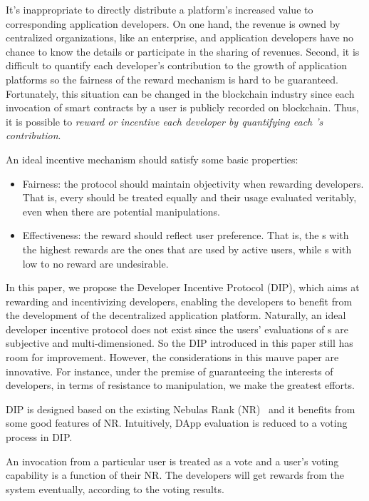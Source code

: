 It's inappropriate to directly distribute a platform's increased value to
corresponding application developers. On one hand, the revenue is owned by
centralized organizations, like an enterprise, and application developers have
no chance to know the details or participate in the sharing of revenues. Second, it
is difficult to quantify each developer's contribution to the growth of
application platforms so the fairness of the reward mechanism is hard to be guaranteed. Fortunately, this situation can be changed in the blockchain
industry since each invocation of smart contracts by a user is
publicly recorded on blockchain. Thus, it is possible to \emph{reward or incentive each \dapp developer by
quantifying each \dapp's contribution}.

An ideal incentive mechanism should satisfy some basic properties:
\begin{itemize}

\item Fairness: the protocol should maintain objectivity when rewarding developers. That is, every {\dapp} should be treated equally and their usage evaluated veritably, even when there are potential manipulations.

\item Effectiveness: the reward should reflect user preference. That is, the {\dapp}s with the highest rewards are the ones that are used by active users, while {\dapp}s with low to no reward are undesirable.
\end{itemize}


In this paper, we propose the Developer Incentive Protocol (DIP), which aims at rewarding and incentivizing  developers, enabling the developers to benefit from the development of the decentralized application platform. Naturally, an ideal developer incentive protocol does not exist since the users' evaluations of {\dapp}s are subjective and multi-dimensioned. So the DIP introduced in this paper still has room for improvement. However, the considerations in this mauve paper are innovative. For instance, under the premise of guaranteeing the interests of \dapp developers, in terms of resistance to manipulation, we make the greatest efforts.

DIP is designed based on the existing Nebulas Rank
(NR)~\cite{Nebulasyellowpaper} and it benefits from some good features of NR\@.
Intuitively, DApp evaluation is reduced to a voting process in DIP\@.

An invocation from a particular user is treated as a vote and a user's voting
capability is a function of their NR\@. The developers will get rewards from the system eventually, according to the voting results.

